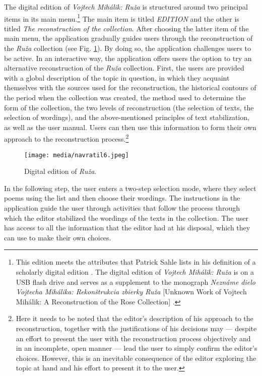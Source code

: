 \begin{paper}
The digital edition of \emph{Vojtech Mihálik:
Ruža} is structured around two principal items in its main menu.\footnote{This edition
  meets the attributes that Patrick Sahle lists in his
  definition of a scholarly digital edition \parencite[38]{sahle_what_2016}. The digital edition of
  \emph{Vojtech Mihálik: Ruža} is on a USB flash drive and serves as a
  supplement to the monograph \emph{Neznáme dielo Vojtecha Mihálika:
  Rekonštrukcia zbierky Ruža} [Unknown Work of Vojtech Mihálik: A
  Reconstruction of the Rose Collection] \parencite{navratil_nezname_2021}.} The main item is titled
\emph{EDITION} and the other is titled \emph{The reconstruction of the
collection}. After choosing the latter item of the main menu, the
application gradually guides users through the reconstruction of the
\emph{Ruža} collection (see Fig. \ref{fig:navratil3}). By doing so, the application challenges users to
be active. In an interactive way, the application offers users the
option to try an alternative reconstruction of the \emph{Ruža}
collection. First, the users are provided with a global description of
the topic in question, in which they acquaint themselves with the
sources used for the reconstruction, the historical contours of the
period when the collection was created, the method used to determine the
form of the collection, the two levels of reconstruction (the selection
of texts, the selection of wordings), and the above-mentioned principles of
text stabilization, as well as the user manual. Users can then use this
information to form their own approach to the reconstruction
process.\footnote{Here it needs to be noted that the editor's
  description of his approach to the reconstruction, together with the
  justifications of his decisions may –– despite an effort to
  present the user with the reconstruction process objectively and in an
  incomplete, open manner –– lead the user to simply confirm the
  editor's choices. However, this is an inevitable consequence of the
  editor exploring the topic at hand and his effort to present it to the
  user.}

\begin{figure}[t]
  \centering
  \texttt{[image: media/navratil6.jpeg]}
    \caption{Digital edition of \emph{Ruža}.}
    \label{fig:navratil3}
  \end{figure}

In the following step, the user enters a two-step selection mode, where
they select poems using the list and then choose their wordings. The
instructions in the application guide the user through activities that
follow the process through which the editor stabilized the wordings of
the texts in the collection. The user has access to all the information
that the editor had at his disposal, which they can use to make their
own choices.


\end{paper}
